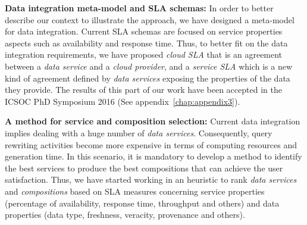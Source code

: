 \bigskip
\noindent \textbf{Data integration meta-model and SLA schemas:}
In order to better describe our context to illustrate the approach, we have designed a meta-model for data integration. Current SLA schemas are focused on service properties aspects such as availability and response time. Thus, to better fit on the data integration requirements, we have proposed \textsl{cloud SLA} that is an agreement between a \textsl{data service} and a \textsl{cloud provider}, and a \textsl{service SLA} which is a new kind of agreement defined by \textsl{data services} exposing the properties of the data they provide. The results of this part of our work have been accepted in the ICSOC PhD Symposium 2016 (See appendix~\ref{chap:appendix3}).


\bigskip
\noindent \textbf{A method for service and composition selection:}
Current data integration implies dealing with a huge number of \textsl{data services}. Consequently, query rewriting activities become more expensive in terms of computing resources and generation time. In this scenario, it is mandatory to develop a method to identify the best services to produce the best compositions that can achieve the user satisfaction. Thus, we have started working in an heuristic to rank \textsl{data services} and \textsl{compositions} based on SLA measures concerning  service properties (percentage of availability, response time, throughput and others) and data properties (data type, freshness, veracity, provenance and others).

